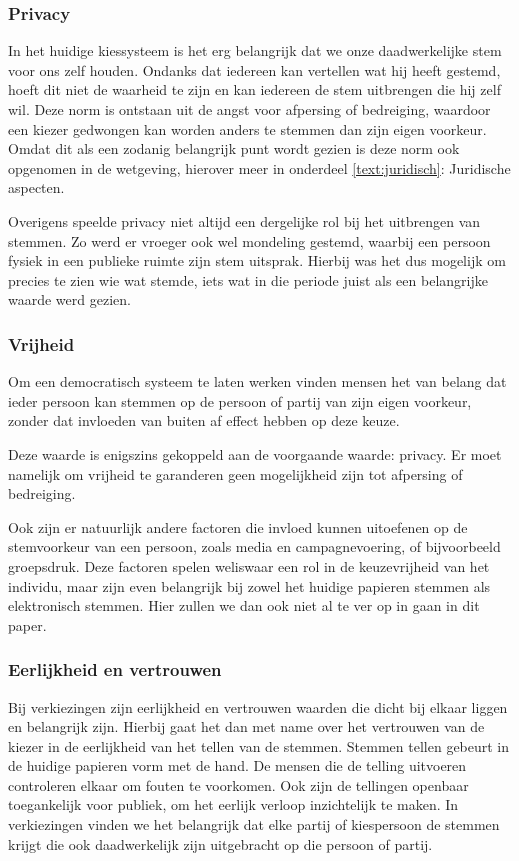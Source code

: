 \documentclass[a4paper]{article}
\begin{document}
\subsubsection{Privacy}
In het huidige kiessysteem is het erg belangrijk dat we onze daadwerkelijke stem voor ons zelf houden.
Ondanks dat iedereen kan vertellen wat hij heeft gestemd, hoeft dit niet de waarheid te zijn en kan iedereen de stem uitbrengen die hij zelf wil.
Deze norm is ontstaan uit de angst voor afpersing of bedreiging, waardoor een kiezer gedwongen kan worden anders te stemmen dan zijn eigen voorkeur.
Omdat dit als een zodanig belangrijk punt wordt gezien is deze norm ook opgenomen in de wetgeving, hierover meer in onderdeel \ref{text:juridisch}: Juridische aspecten.

Overigens speelde privacy niet altijd een dergelijke rol bij het uitbrengen van stemmen.
Zo werd er vroeger ook wel mondeling gestemd, waarbij een persoon fysiek in een publieke ruimte zijn stem uitsprak.
Hierbij was het dus mogelijk om precies te zien wie wat stemde, iets wat in die periode juist als een belangrijke waarde werd gezien.

\subsubsection{Vrijheid}
Om een democratisch systeem te laten werken vinden mensen het van belang dat ieder persoon kan stemmen op de persoon of partij van zijn eigen voorkeur, zonder dat invloeden van buiten af effect hebben op deze keuze.

Deze waarde is enigszins gekoppeld aan de voorgaande waarde: privacy. Er moet namelijk om vrijheid te garanderen geen mogelijkheid zijn tot afpersing of bedreiging.

Ook zijn er natuurlijk andere factoren die invloed kunnen uitoefenen op de stemvoorkeur van een persoon, zoals media en campagnevoering, of bijvoorbeeld groepsdruk.
Deze factoren spelen weliswaar een rol in de keuzevrijheid van het individu, maar zijn even belangrijk bij zowel het huidige papieren stemmen als elektronisch stemmen.
Hier zullen we dan ook niet al te ver op in gaan in dit paper.

\subsubsection{Eerlijkheid en vertrouwen}
Bij verkiezingen zijn eerlijkheid en vertrouwen waarden die dicht bij elkaar liggen en belangrijk zijn.
Hierbij gaat het dan met name over het vertrouwen van de kiezer in de eerlijkheid van het tellen van de stemmen.
Stemmen tellen gebeurt in de huidige papieren vorm met de hand.
De mensen die de telling uitvoeren controleren elkaar om fouten te voorkomen.
Ook zijn de tellingen openbaar toegankelijk voor publiek, om het eerlijk verloop inzichtelijk te maken.
In verkiezingen vinden we het belangrijk dat elke partij of kiespersoon de stemmen krijgt die ook daadwerkelijk zijn uitgebracht op die persoon of partij.
\end{document}
